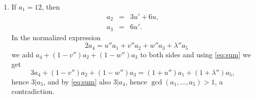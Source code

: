 \documentclass[12pt]{amsart}
\begin{document}
\begin{enumerate}[leftmargin=0.5cm,label*=\arabic*.]
										Therefore  $\lambda''=0$ and 
											$$2a_4= u'' a_1 + v'' a_2 + w'' a_3.
											$$ 
											Since $a_2, a_3<a_4$ we should have $u''>0$.
											Because $4|a_1$ and $4|a_3$, we can not have $v''=0$, otherwise $a_4$ is even, and by \eqref{eq:sum} also $a_5$ is even, which gives a contradiction. 
											Hence $v''=1$. We distinguish two situations.
											 \begin{enumerate}[leftmargin=0.5cm, label*=\arabic*.]
												\item If \underline{$w''=1$}, then $2 a_4= u'' a_1 + a_2+ a_3$. This gives 
													\begin{eqnarray}
													\label{eq:sol1}
														a_1 &=& 8, \nonumber  \\ 
														a_3 &=& 4u',  \nonumber \\
														a_2 &=& 4u+2u',  \\
														a_4 &=& 4u''+ 2u+ 3u', \nonumber\\
														a_5 &=& 9u'+6u+4u''-8, \nonumber
													\end{eqnarray}
													which is of the desired form.
												\item If \underline{$w''=0$}, then $2 a_4= u'' a_1 + a_2$. This gives
													\begin{eqnarray}
													\label{eq:sol2}
													a_1 &=& 8, \nonumber  \\ 
													a_3 &=& 4u',  \nonumber \\
													a_2 &=& 4u+2u',  \\
													a_4 &=& 4u''+ 2u+  u', \nonumber\\
													a_5 &=& 7u'+6u+4u''-8, \nonumber
												\end{eqnarray}
											   which is of the desired form.
											 \end{enumerate}
						\item If \underline{$a_1=12$}, then
							\begin{eqnarray*}
								a_2 &=& 3u'+ 6u,\\ 
								a_3 &=& 6u'.
							\end{eqnarray*}
							In the normalized expression 
											$$
											\quad 2a_4= u'' a_1 + v'' a_2 + w'' a_3 +\lambda'' a_5 
											$$ 
							we add $a_4+(1-v'') a_2+ (1-w'')a_3$ to both sides and using \eqref{eq:sum} we get
							$$
							3 a_4 +(1-v'')a_2+(1-w'')a_3= (1+u'')a_1+ (1+\lambda'')a_5,
							$$
							hence $3|a_5$, and by \eqref{eq:sum} also $3|a_4$, hence $\gcd(a_1, \dots, a_5) >1$, a contradiction.
						\end{enumerate}
\end{document}
